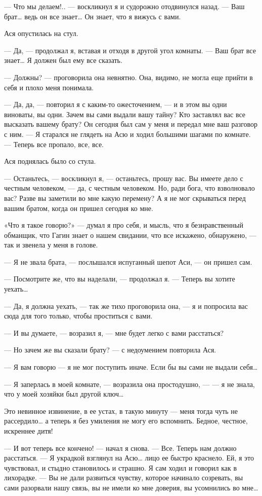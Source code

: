 — Что мы делаем!.. — воскликнул я и судорожно отодвинулся назад. — Ваш брат… ведь он все знает… Он знает, что я вижусь с вами.

Ася опустилась на стул.

— Да, — продолжал я, вставая и отходя в другой угол комнаты. — Ваш брат все знает… Я должен был ему все сказать.

— Должны? — проговорила она невнятно. Она, видимо, не могла еще прийти в себя и плохо меня понимала.

— Да, да, — повторил я с каким-то ожесточением, — и в этом вы одни виноваты, вы одни. Зачем вы сами выдали вашу тайну? Кто заставлял вас все высказать вашему брату? Он сегодня был сам у меня и передал мне ваш разговор с ним. — Я старался не глядеть на Асю и ходил большими шагами по комнате. — Теперь все пропало, все, все.

Ася поднялась было со стула.

— Останьтесь, — воскликнул я, — останьтесь, прошу вас. Вы имеете дело с честным человеком, — да, с честным человеком. Но, ради бога, что взволновало вас? Разве вы заметили во мне какую перемену? А я не мог скрываться перед вашим братом, когда он пришел сегодня ко мне.

«Что я такое говорю?» — думал я про себя, и мысль, что я безнравственный обманщик, что Гагин знает о нашем свидании, что все искажено, обнаружено, — так и звенела у меня в голове.

— Я не звала брата, — послышался испуганный шепот Аси, — он пришел сам.

— Посмотрите же, что вы наделали, — продолжал я. — Теперь вы хотите уехать…

— Да, я должна уехать, — так же тихо проговорила она, — я и попросила вас сюда для того только, чтобы проститься с вами.

— И вы думаете, — возразил я, — мне будет легко с вами расстаться?

— Но зачем же вы сказали брату? — с недоумением повторила Ася.

— Я вам говорю — я не мог поступить иначе. Если бы вы сами не выдали себя…

— Я заперлась в моей комнате, — возразила она простодушно, — — я не знала, что у моей хозяйки был другой ключ…

Это невинное извинение, в ее устах, в такую минуту — меня тогда чуть не рассердило… а теперь я без умиления не могу его вспомнить. Бедное, честное, искреннее дитя!

— И вот теперь все кончено! — начал я снова. — Все. Теперь нам должно расстаться. — Я украдкой взглянул на Асю… лицо ее быстро краснело. Ей, я это чувствовал, и стыдно становилось и страшно. Я сам ходил и говорил как в лихорадке. — Вы не дали развиться чувству, которое начинало созревать, вы сами разорвали нашу связь, вы не имели ко мне доверия, вы усомнились во мне…

